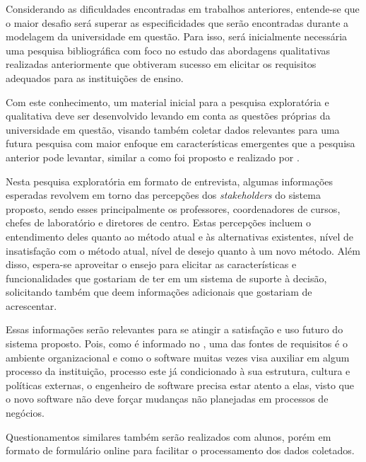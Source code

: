     Considerando as dificuldades encontradas em trabalhos anteriores, entende-se que o maior desafio será superar as especificidades que serão encontradas durante a modelagem da universidade em questão. Para isso, será inicialmente necessária uma pesquisa bibliográfica com foco no estudo das abordagens qualitativas realizadas anteriormente que obtiveram sucesso em elicitar os requisitos adequados para as instituições de ensino.


    Com este conhecimento, um material inicial para a pesquisa exploratória e qualitativa deve ser desenvolvido levando em conta as questões próprias da universidade em questão, visando também coletar dados relevantes para uma futura pesquisa com maior enfoque em características emergentes que a pesquisa anterior pode levantar, similar a como foi proposto e realizado por \cite{andre_interaction_2018}.

    Nesta pesquisa exploratória em formato de entrevista, algumas informações esperadas revolvem em torno das percepções dos \textit{stakeholders} do sistema proposto, sendo esses principalmente os professores, coordenadores de cursos, chefes de laboratório e diretores de centro. Estas percepções incluem o entendimento deles quanto ao método atual e às alternativas existentes, nível de insatisfação com o método atual, nível de desejo quanto à um novo método. Além disso, espera-se aproveitar o ensejo para elicitar as características e funcionalidades que gostariam de ter em um sistema de suporte à decisão, solicitando também que deem informações adicionais que gostariam de acrescentar.

    Essas informações serão relevantes para se atingir a satisfação e uso futuro do sistema proposto. Pois, como é informado no \cite{bourque_swebok_2014}, uma das fontes de requisitos é o ambiente organizacional e como o software muitas vezes visa auxiliar em algum processo da instituição, processo este já condicionado à sua estrutura, cultura e políticas externas, o engenheiro de software precisa estar atento a elas, visto que o novo software não deve forçar mudanças não planejadas em processos de negócios.

    Questionamentos similares também serão realizados com alunos, porém em formato de formulário online para facilitar o processamento dos dados coletados.

    \def\LinkParadigm{https://www.visual-paradigm.com/}
    \def\LinkDrawio{https://www.drawio.com/}
    \def\LinkMermaid{https://mermaid.js.org/}

